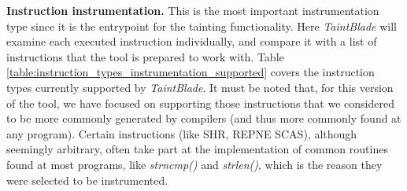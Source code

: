 \documentclass[conference]{IEEEtran}
\begin{document}
\textbf{Instruction instrumentation.}
This is the most important instrumentation type since it is the entrypoint for the tainting functionality.
Here \textit{TaintBlade} will examine each executed instruction individually, and
compare it with a list of instructions that the tool is prepared to work with. Table \ref{table:instruction_types_instrumentation_supported}
covers the instruction types currently supported by \textit{TaintBlade}. It must be noted that, for this version of the tool, we have focused
on supporting those instructions that we considered to be more commonly generated by compilers (and thus
more commonly found at any program). Certain instructions (like SHR, REPNE SCAS), although seemingly arbitrary,
often take part at the implementation of common routines found at most programs, like \textit{strncmp()} and \textit{strlen()},
which is the reason they were selected to be instrumented.
\end{document}
